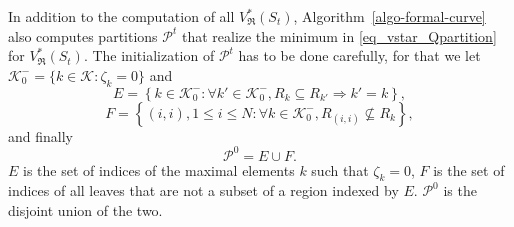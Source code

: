 \documentclass[
  11pt,
  a4paper,
]{article}
\theoremstyle{plain}
\theoremstyle{definition}
\theoremstyle{plain}
\theoremstyle{definition}
\theoremstyle{plain}
\theoremstyle{remark}
\begin{document}
In addition to the computation of all \(V^*_{\mathfrak{R}}(S_t)\),
Algorithm~\ref{algo-formal-curve} also computes partitions
\(\mathcal{P}^t\) that realize the minimum in
\eqref{eq_vstar_Qpartition} for \(V^*_{\mathfrak{R}}(S_t)\). The
initialization of \(\mathcal{P}^t\) has to be done carefully, for that
we let \(\mathcal{K}_0^-=\{k\in\mathcal{K}: \zeta_k=0  \}\) and
\begin{equation}
E=\left\{k\in\mathcal{K}_0^-:\forall k'\in \mathcal{K}_0^-, R_k\subseteq R_{k'}\Rightarrow k'=k \right\},
\label{E}
\end{equation} \begin{equation}
F=\left\{(i,i), 1\leq i\leq N:\forall k\in \mathcal{K}_0^-, R_{(i,i)}\not\subseteq R_k  \right\},
\label{F}
\end{equation} and finally \begin{equation}
\mathcal{P}^0=E\cup F.
\label{cP0}
\end{equation} \(E\) is the set of indices of the maximal elements \(k\)
such that \(\zeta_k=0\), \(F\) is the set of indices of all leaves that
are not a subset of a region indexed by \(E\). \(\mathcal{P}^0\) is the
disjoint union of the two.
\end{document}
